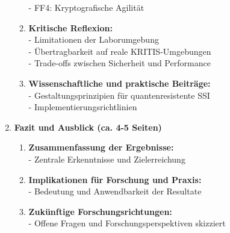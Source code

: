 \begin{enumerate}[label=\textbf{\arabic*.}]
\begin{enumerate}[label=\textbf{6.\arabic*}]
        - FF4: Kryptografische Agilität
        \item \textbf{Kritische Reflexion:} \\
        - Limitationen der Laborumgebung \\
        - Übertragbarkeit auf reale \ac{KRITIS}-Umgebungen \\
        - Trade-offs zwischen Sicherheit und Performance
        \item \textbf{Wissenschaftliche und praktische Beiträge:} \\
        - Gestaltungsprinzipien für quantenresistente \ac{SSI} \\
        - Implementierungsrichtlinien
    \end{enumerate}
    \item \textbf{Fazit und Ausblick (ca. 4-5 Seiten)}
    \begin{enumerate}[label=\textbf{7.\arabic*}]
        \item \textbf{Zusammenfassung der Ergebnisse:} \\
        - Zentrale Erkenntnisse und Zielerreichung
        \item \textbf{Implikationen für Forschung und Praxis:} \\
        - Bedeutung und Anwendbarkeit der Resultate
        \item \textbf{Zukünftige Forschungsrichtungen:} \\
        - Offene Fragen und Forschungsperspektiven skizziert
    \end{enumerate}
\end{enumerate}